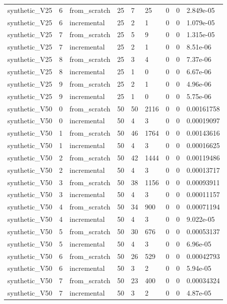 \begin{table}[t]
\begin{tabular}{lllllllll}
synthetic\_V25 & 6 & from\_scratch & 25 & 7 & 25 & 0 & 0 & 2.849e-05 \\
synthetic\_V25 & 6 & incremental & 25 & 2 & 1 & 0 & 0 & 1.079e-05 \\
synthetic\_V25 & 7 & from\_scratch & 25 & 5 & 9 & 0 & 0 & 1.315e-05 \\
synthetic\_V25 & 7 & incremental & 25 & 2 & 1 & 0 & 0 & 8.51e-06 \\
synthetic\_V25 & 8 & from\_scratch & 25 & 3 & 4 & 0 & 0 & 7.37e-06 \\
synthetic\_V25 & 8 & incremental & 25 & 1 & 0 & 0 & 0 & 6.67e-06 \\
synthetic\_V25 & 9 & from\_scratch & 25 & 2 & 1 & 0 & 0 & 4.96e-06 \\
synthetic\_V25 & 9 & incremental & 25 & 1 & 0 & 0 & 0 & 5.75e-06 \\
synthetic\_V50 & 0 & from\_scratch & 50 & 50 & 2116 & 0 & 0 & 0.00161758 \\
synthetic\_V50 & 0 & incremental & 50 & 4 & 3 & 0 & 0 & 0.00019097 \\
synthetic\_V50 & 1 & from\_scratch & 50 & 46 & 1764 & 0 & 0 & 0.00143616 \\
synthetic\_V50 & 1 & incremental & 50 & 4 & 3 & 0 & 0 & 0.00016625 \\
synthetic\_V50 & 2 & from\_scratch & 50 & 42 & 1444 & 0 & 0 & 0.00119486 \\
synthetic\_V50 & 2 & incremental & 50 & 4 & 3 & 0 & 0 & 0.00013717 \\
synthetic\_V50 & 3 & from\_scratch & 50 & 38 & 1156 & 0 & 0 & 0.00093911 \\
synthetic\_V50 & 3 & incremental & 50 & 4 & 3 & 0 & 0 & 0.00011157 \\
synthetic\_V50 & 4 & from\_scratch & 50 & 34 & 900 & 0 & 0 & 0.00071194 \\
synthetic\_V50 & 4 & incremental & 50 & 4 & 3 & 0 & 0 & 9.022e-05 \\
synthetic\_V50 & 5 & from\_scratch & 50 & 30 & 676 & 0 & 0 & 0.00053137 \\
synthetic\_V50 & 5 & incremental & 50 & 4 & 3 & 0 & 0 & 6.96e-05 \\
synthetic\_V50 & 6 & from\_scratch & 50 & 26 & 529 & 0 & 0 & 0.00042793 \\
synthetic\_V50 & 6 & incremental & 50 & 3 & 2 & 0 & 0 & 5.94e-05 \\
synthetic\_V50 & 7 & from\_scratch & 50 & 23 & 400 & 0 & 0 & 0.00034324 \\
synthetic\_V50 & 7 & incremental & 50 & 3 & 2 & 0 & 0 & 4.87e-05 \\

\end{tabular}
\end{table}
